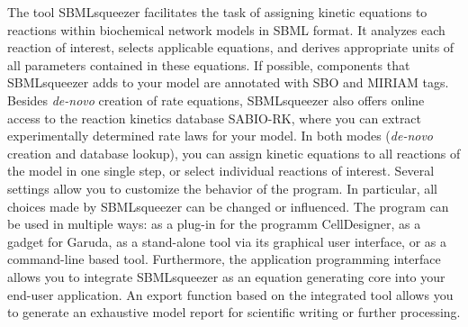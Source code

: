 The tool SBMLsqueezer facilitates the task of assigning kinetic equations to
reactions within biochemical network models in SBML format.
It analyzes each reaction of interest, selects applicable equations, and derives
appropriate units of all parameters contained in these equations.
If possible, components that SBMLsqueezer adds to your model are annotated with
\ac{SBO} and \ac{MIRIAM} tags.
Besides \emph{de-novo} creation of rate equations, SBMLsqueezer also offers
online access to the reaction kinetics database \ac{SABIO-RK}, where you can extract
experimentally determined rate laws for your model.
In both modes (\emph{de-novo} creation and database lookup), you can assign kinetic equations to all reactions of the model in
one single step, or select individual reactions of interest. 
Several settings allow you to customize the behavior of the program.
In particular, all choices made by SBMLsqueezer can be changed or influenced.
The program can be used in multiple ways: as a plug-in for the programm
CellDesigner, as a gadget for Garuda, as a stand-alone tool via its graphical
user interface, or as a command-line based tool.
Furthermore, the application programming interface allows you to integrate
SBMLsqueezer as an equation generating core into your end-user application.
An export function based on the integrated tool \SBMLLaTeXs{} allows you to
generate an exhaustive model report for scientific writing or further
processing.
